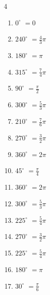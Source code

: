 \begin{multicols}{4}
\begin{enumerate}
  \item $\displaystyle 0^{\circ}$
        $\displaystyle =0$

  \item $\displaystyle 240^{\circ}$
        $\displaystyle =\frac{4}{3}\pi$

  \item $\displaystyle 180^{\circ}$
        $\displaystyle =\pi$

  \item $\displaystyle 315^{\circ}$
        $\displaystyle =\frac{7}{4}\pi$

  \item $\displaystyle 90^{\circ}$
        $\displaystyle =\frac{\pi}{2}$

  \item $\displaystyle 300^{\circ}$
        $\displaystyle =\frac{5}{3}\pi$

\columnbreak %

  \item $\displaystyle 210^{\circ}$
        $\displaystyle =\frac{7}{6}\pi$

  \item $\displaystyle 270^{\circ}$
        $\displaystyle =\frac{3}{2}\pi$

  \item $\displaystyle 360^{\circ}$
        $\displaystyle =2\pi$

  \item $\displaystyle 45^{\circ}$
        $\displaystyle =\frac{\pi}{4}$

  \item $\displaystyle 360^{\circ}$
        $\displaystyle =2\pi$

  \item $\displaystyle 300^{\circ}$
        $\displaystyle =\frac{5}{3}\pi$

  \item $\displaystyle 225^{\circ}$
        $\displaystyle =\frac{5}{4}\pi$

  \item $\displaystyle 270^{\circ}$
        $\displaystyle =\frac{3}{2}\pi$

  \item $\displaystyle 225^{\circ}$
        $\displaystyle =\frac{5}{4}\pi$

  \item $\displaystyle 180^{\circ}$
        $\displaystyle =\pi$

  \item $\displaystyle 30^{\circ}$
        $\displaystyle =\frac{\pi}{6}$


\end{enumerate}
\end{multicols}
